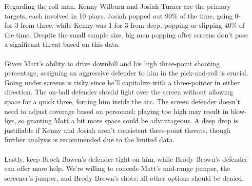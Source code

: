 \documentclass[a4paper,12pt]{article}
\begin{document}
\begin{multicols}{2}
    Regarding the roll man, Kenny Wilburn and Josiah Turner are the primary targets, each involved in 10 plays. Josiah popped out 90\% of the time, going 0-for-3 from three, while Kenny was 1-for-3 from deep, popping or slipping 40\% of the time. Despite the small sample size, big men popping after screens don't pose a significant threat based on this data.\\ \\
    Given Matt's ability to drive downhill and his high three-point shooting percentage, assigning an aggressive defender to him in the pick-and-roll is crucial. Going under screens is risky since he'll capitalize with a three-pointer in either direction. The on-ball defender should fight over the screen without allowing space for a quick three, forcing him inside the arc. The screen defender doesn't need to adjust coverage based on personnel; playing too high may result in blow-bys, so granting Matt a bit more space could be advantageous. A deep drop is justifiable if Kenny and Josiah aren't consistent three-point threats, though further analysis is recommended due to the limited data. \\ \\
    Lastly, keep Brock Bowen's defender tight on him, while Brody Brown's defender can offer more help. We're willing to concede Matt's mid-range jumper, the screener's jumper, and Brody Brown's shots; all other options should be denied.      
    \vspace{1em}
    

\end{multicols}
\end{document}
